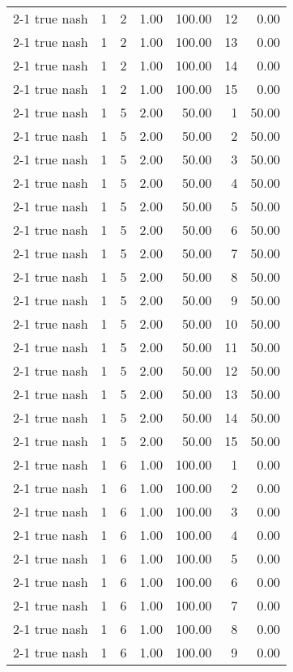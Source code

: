 \begin{tabular}{lrrrrrr}
2-1  true nash & 1 & 2 & 1.00 & 100.00 & 12 & 0.00 \\
2-1  true nash & 1 & 2 & 1.00 & 100.00 & 13 & 0.00 \\
2-1  true nash & 1 & 2 & 1.00 & 100.00 & 14 & 0.00 \\
2-1  true nash & 1 & 2 & 1.00 & 100.00 & 15 & 0.00 \\
2-1  true nash & 1 & 5 & 2.00 & 50.00 & 1 & 50.00 \\
2-1  true nash & 1 & 5 & 2.00 & 50.00 & 2 & 50.00 \\
2-1  true nash & 1 & 5 & 2.00 & 50.00 & 3 & 50.00 \\
2-1  true nash & 1 & 5 & 2.00 & 50.00 & 4 & 50.00 \\
2-1  true nash & 1 & 5 & 2.00 & 50.00 & 5 & 50.00 \\
2-1  true nash & 1 & 5 & 2.00 & 50.00 & 6 & 50.00 \\
2-1  true nash & 1 & 5 & 2.00 & 50.00 & 7 & 50.00 \\
2-1  true nash & 1 & 5 & 2.00 & 50.00 & 8 & 50.00 \\
2-1  true nash & 1 & 5 & 2.00 & 50.00 & 9 & 50.00 \\
2-1  true nash & 1 & 5 & 2.00 & 50.00 & 10 & 50.00 \\
2-1  true nash & 1 & 5 & 2.00 & 50.00 & 11 & 50.00 \\
2-1  true nash & 1 & 5 & 2.00 & 50.00 & 12 & 50.00 \\
2-1  true nash & 1 & 5 & 2.00 & 50.00 & 13 & 50.00 \\
2-1  true nash & 1 & 5 & 2.00 & 50.00 & 14 & 50.00 \\
2-1  true nash & 1 & 5 & 2.00 & 50.00 & 15 & 50.00 \\
2-1  true nash & 1 & 6 & 1.00 & 100.00 & 1 & 0.00 \\
2-1  true nash & 1 & 6 & 1.00 & 100.00 & 2 & 0.00 \\
2-1  true nash & 1 & 6 & 1.00 & 100.00 & 3 & 0.00 \\
2-1  true nash & 1 & 6 & 1.00 & 100.00 & 4 & 0.00 \\
2-1  true nash & 1 & 6 & 1.00 & 100.00 & 5 & 0.00 \\
2-1  true nash & 1 & 6 & 1.00 & 100.00 & 6 & 0.00 \\
2-1  true nash & 1 & 6 & 1.00 & 100.00 & 7 & 0.00 \\
2-1  true nash & 1 & 6 & 1.00 & 100.00 & 8 & 0.00 \\
2-1  true nash & 1 & 6 & 1.00 & 100.00 & 9 & 0.00 \\

\end{tabular}

